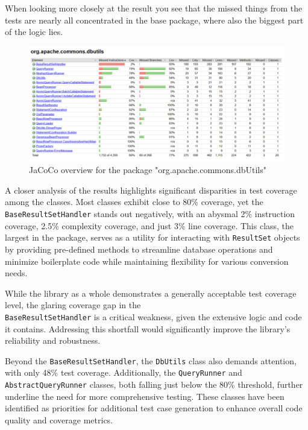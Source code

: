 \documentclass[sigconf]{acmart}
\begin{document}
When looking more closely at the result you see that the missed things from the tests are nearly all concentrated in the base package, where also the biggest part of the logic lies.

\begin{figure}[H]
    \centering
    \includegraphics[width=1\linewidth]{images/jacoco2.png}
    \caption{JaCoCo overview for the package "org.apache.commons.dbUtils"}
\end{figure}

A closer analysis of the results highlights significant disparities in test coverage among the classes. Most classes exhibit close to 80\% coverage, yet the \texttt{BaseResultSetHandler} stands out negatively, with an abysmal 2\% instruction coverage, 2.5\% complexity coverage, and just 3\% line coverage. This class, the largest in the package, serves as a utility for interacting with \texttt{ResultSet} objects by providing pre-defined methods to streamline database operations and minimize boilerplate code while maintaining flexibility for various conversion needs.

While the library as a whole demonstrates a generally acceptable test coverage level, the glaring coverage gap in the \\
\texttt{BaseResultSetHandler} is a critical weakness, given the extensive logic and code it contains. Addressing this shortfall would significantly improve the library's reliability and robustness.

Beyond the \texttt{BaseResultSetHandler}, the \texttt{DbUtils} class also demands attention, with only 48\% test coverage. Additionally, the \texttt{QueryRunner} and \texttt{AbstractQueryRunner} classes, both falling just below the 80\% threshold, further underline the need for more comprehensive testing. These classes have been identified as priorities for additional test case generation to enhance overall code quality and coverage metrics.
\end{document}
